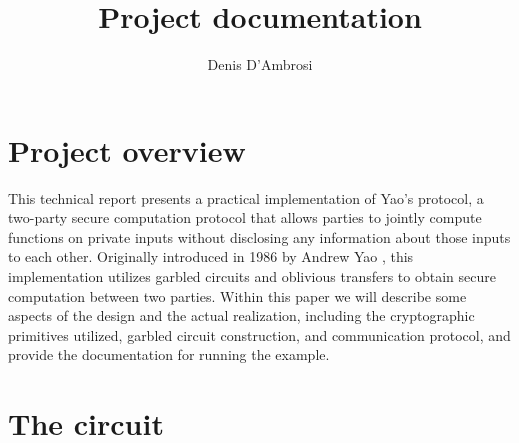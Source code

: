 \documentclass[12pt]{article}
\title{Project documentation}
\author{Denis D'Ambrosi}
\begin{document}
\maketitle

\section{Project overview}

This technical report presents a practical implementation of Yao's protocol, a two-party secure computation protocol that allows parties to jointly compute functions on private inputs without disclosing any information about those inputs to each other. Originally introduced in 1986 by Andrew Yao \cite{YAO}, this implementation utilizes garbled circuits and oblivious transfers to obtain secure computation between two parties. Within this paper we will describe some aspects of the design and the actual realization, including the cryptographic primitives utilized, garbled circuit construction, and communication protocol, and provide the documentation for running the example.

\section{The circuit}
\end{document}
